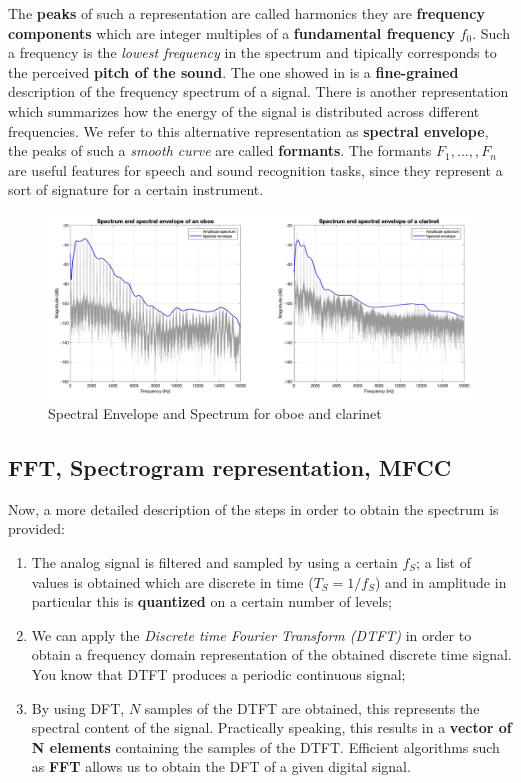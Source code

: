 The \textbf{peaks} of such a representation are called harmonics they are \textbf{frequency components} which are integer multiples of a \textbf{fundamental frequency} $f_0$. Such a frequency is the \textit{lowest frequency} in the spectrum and tipically corresponds to the perceived \textbf{pitch of the sound}. The one showed in  is a \textbf{fine-grained} description of the frequency spectrum of a signal. There is another representation which summarizes how the energy of the signal is distributed across different frequencies. We refer to this alternative representation as \textbf{spectral envelope}, the peaks of such a \textit{smooth curve} are called \textbf{formants}. The formants $F_1,...,,F_n$ are useful features for speech and sound recognition tasks, since they represent a sort of signature for a certain instrument.

\begin{figure}[h]
    \centering
    \includegraphics[scale=0.5]{img/SpectralEnvelope.png}
    \caption{Spectral Envelope and Spectrum for oboe and clarinet}
\end{figure}

\newpage
\subsection{FFT, Spectrogram representation, MFCC}
Now, a more detailed description of the steps in order to obtain the spectrum is provided: 
\begin{enumerate}
    \itemsep-0.3em
    \item The analog signal is filtered and sampled by using a certain $f_S$; a list of values is obtained which are discrete in time ($T_S=1/f_S$) and in amplitude in particular this is \textbf{quantized} on a certain number of levels; 
    \item We can apply the \textit{Discrete time Fourier Transform (DTFT)} in order to obtain a frequency domain representation of the obtained discrete time signal. You know that DTFT produces a periodic continuous signal; 
    \item By using DFT, $N$ samples of the DTFT are obtained, this represents the spectral content of the signal. Practically speaking, this results in a \textbf{vector of N elements} containing the samples of the DTFT. Efficient algorithms such as \textbf{FFT} allows us to obtain the DFT of a given digital signal.
\end{enumerate}

